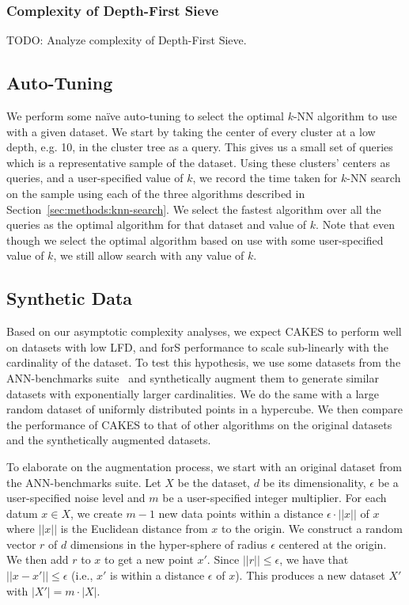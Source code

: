 \subsubsection{Complexity of Depth-First Sieve}
\label{sec:methods:knn-search:depth-first-sieve-complexity}

TODO: Analyze complexity of Depth-First Sieve.


\subsection{Auto-Tuning}
\label{sec:methods:auto-tuning}

We perform some na\"{i}ve auto-tuning to select the optimal $k$-NN algorithm to use with a given dataset.
We start by taking the center of every cluster at a low depth, e.g. 10, in the cluster tree as a query.
This gives us a small set of queries which is a representative sample of the dataset.
Using these clusters' centers as queries, and a user-specified value of $k$, we record the time taken for $k$-NN search on the sample using each of the three algorithms described in Section~\ref{sec:methods:knn-search}.
We select the fastest algorithm over all the queries as the optimal algorithm for that dataset and value of $k$.
Note that even though we select the optimal algorithm based on use with some user-specified value of $k$, we still allow search with any value of $k$.


\subsection{Synthetic Data}
\label{sec:methods:synthetic-data}

Based on our asymptotic complexity analyses, we expect CAKES to perform well on datasets with low LFD, and forS performance to scale sub-linearly with the cardinality of the dataset.
To test this hypothesis, we use some datasets from the ANN-benchmarks suite~\cite{aumuller2020ann} and synthetically augment them to generate similar datasets with exponentially larger cardinalities.
We do the same with a large random dataset of uniformly distributed points in a hypercube.
We then compare the performance of CAKES to that of other algorithms on the original datasets and the synthetically augmented datasets.

To elaborate on the augmentation process, we start with an original dataset from the ANN-benchmarks suite.
Let $X$ be the dataset, $d$ be its dimensionality, $\epsilon$ be a user-specified noise level and $m$ be a user-specified integer multiplier.
For each datum $x \in X$, we create $m - 1$ new data points within a distance $\epsilon \cdot ||x||$ of $x$ where $||x||$ is the Euclidean distance from $x$ to the origin.
We construct a random vector $r$ of $d$ dimensions in the hyper-sphere of radius $\epsilon$ centered at the origin.
We then add $r$ to $x$ to get a new point $x'$.
Since $||r|| \leq \epsilon$, we have that $||x - x'|| \leq \epsilon$ (i.e., $x'$ is within a distance $\epsilon$ of $x$).
This produces a new dataset $X'$ with $|X'| = m \cdot |X|$.

